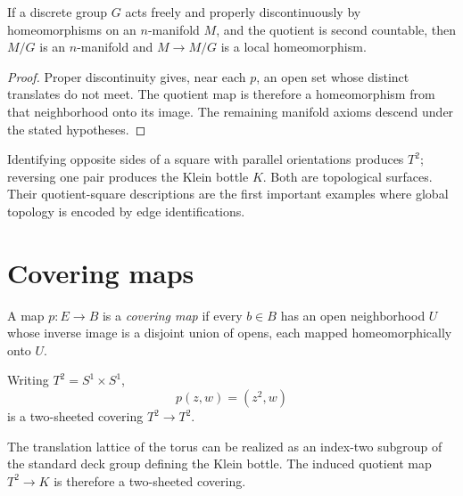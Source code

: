 \begin{proposition}\label{prop:vii01-proper-discontinuous}
If a discrete group \(G\) acts freely and properly discontinuously by homeomorphisms on an \(n\)-manifold \(M\), and the quotient is second countable, then \(M/G\) is an \(n\)-manifold and \(M\to M/G\) is a local homeomorphism.
\end{proposition}
\begin{proof}
Proper discontinuity gives, near each \(p\), an open set whose distinct translates do not meet.  The quotient map is therefore a homeomorphism from that neighborhood onto its image.  The remaining manifold axioms descend under the stated hypotheses.
\end{proof}

\begin{example}\label{ex:vii01-identification-surfaces}
Identifying opposite sides of a square with parallel orientations produces \(T^2\); reversing one pair produces the Klein bottle \(K\).  Both are topological surfaces.  Their quotient-square descriptions are the first important examples where global topology is encoded by edge identifications.
\end{example}

\section{Covering maps}
\begin{definition}\label{def:vii01-covering}
A map \(p:E\to B\) is a \emph{covering map} if every \(b\in B\) has an open neighborhood \(U\) whose inverse image is a disjoint union of opens, each mapped homeomorphically onto \(U\).
\end{definition}

\begin{example}\label{ex:vii01-torus-double-cover}
Writing \(T^2=S^1\times S^1\),
\[
p(z,w)=(z^2,w)
\]
is a two-sheeted covering \(T^2\to T^2\).
\end{example}

\begin{example}\label{ex:vii01-torus-klein-cover}
The translation lattice of the torus can be realized as an index-two subgroup of the standard deck group defining the Klein bottle.  The induced quotient map \(T^2\to K\) is therefore a two-sheeted covering.
\end{example}

